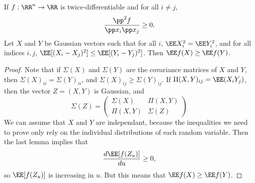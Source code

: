 \begin{lemma}
    If $f: \RR^n \to \RR$ is twice-differentiable and for all $i \neq j$,
    \[ \frac{\pp^2 f}{\pp x_i \pp x_j} \geq 0. \]
    Let $X$ and $Y$ be Gaussian vectors such that for all $i$, $\EE X_i^2 = \EE Y_i^2$, and for all indices $i,j$, $\EE [(X_i - X_j)^2] \leq \EE[(Y_i - Y_j)^2]$. Then $\EE f(X) \geq \EE f(Y)$.
\end{lemma}
\begin{proof}
    Note that if $\Sigma(X)$ and $\Sigma(Y)$ are the covariance matrices of $X$ and $Y$, then $\Sigma(X)_{ii} = \Sigma(Y)_{ii}$, and $\Sigma(X)_{ij} \geq \Sigma(Y)_{ij}$. If $\Pi(X,Y)_{ij} = \EE(X_i Y_j)$, then the vector $Z = (X,Y)$ is Gaussian, and
    \[ \Sigma(Z) = \begin{pmatrix} \Sigma(X) & \Pi(X,Y) \\ \Pi(X,Y) & \Sigma(Z) \end{pmatrix} \]
    We can assume that $X$ and $Y$ are independant, because the inequalities we need to prove only rely on the individual distributions of each random variable. Then the last lemma implies that
    \[ \frac{d \EE[f(Z_u)]}{du} \geq 0, \]
    so $\EE[f(Z_u)]$ is increasing in $u$. But this means that $\EE f(X) \geq \EE f(Y)$.
\end{proof}

